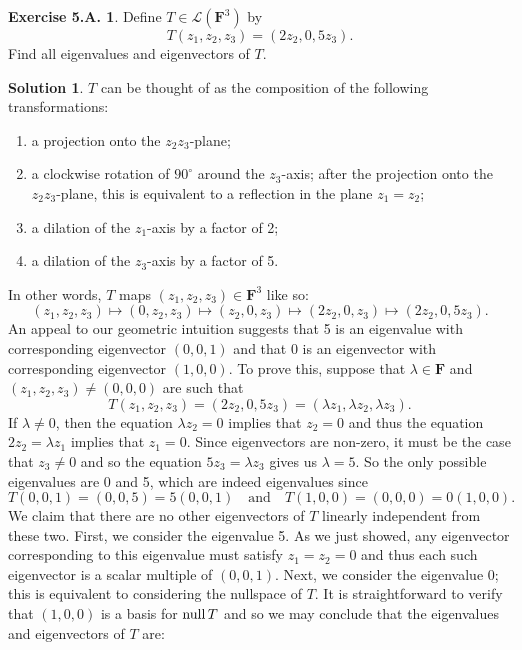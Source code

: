 \documentclass[12pt]{article}
\theoremstyle{definition}
\theoremstyle{exercise}
\newtheorem{exercise}{Exercise 5.A.}
\theoremstyle{solution}
\newtheorem*{solution}{Solution}
\newcommand{\lmap}{\mathcal{L}}
\newcommand{\Null}{\text{null\,}}
\newcommand{\quand}{\quad \text{and} \quad}
\newcommand{\F}{\mathbf{F}}
\begin{document}
\begin{exercise}
\label{ex:9}
    Define \( T \in \lmap(\F^3) \) by
    \[
        T(z_1, z_2, z_3) = (2 z_2, 0, 5 z_3).
    \]
    Find all eigenvalues and eigenvectors of \( T \).
\end{exercise}

\begin{solution}
    \( T \) can be thought of as the composition of the following transformations:
    \begin{enumerate}[label=\arabic*.]
        \item a projection onto the \( z_2 z_3 \)-plane;
        \item a clockwise rotation of \( 90^{\circ} \) around the \( z_3 \)-axis; after the projection onto the \( z_2 z_3 \)-plane, this is equivalent to a reflection in the plane \( z_1 = z_2 \);
        \item a dilation of the \( z_1 \)-axis by a factor of 2;
        \item a dilation of the \( z_3 \)-axis by a factor of 5.
    \end{enumerate}
    In other words, \( T \) maps \( (z_1, z_2, z_3) \in \F^3 \) like so:
    \[
        (z_1, z_2, z_3) \mapsto (0, z_2, z_3) \mapsto (z_2, 0, z_3) \mapsto (2 z_2, 0, z_3) \mapsto (2 z_2, 0, 5 z_3).
    \]
    An appeal to our geometric intuition suggests that 5 is an eigenvalue with corresponding eigenvector \( (0, 0, 1) \) and that 0 is an eigenvector with corresponding eigenvector \( (1, 0, 0) \). To prove this, suppose that \( \lambda \in \F \) and \( (z_1, z_2, z_3) \neq (0, 0, 0) \) are such that
    \[
        T(z_1, z_2, z_3) = (2 z_2, 0, 5 z_3) = (\lambda z_1, \lambda z_2, \lambda z_3).
    \]
    If \( \lambda \neq 0 \), then the equation \( \lambda z_2 = 0 \) implies that \( z_2 = 0 \) and thus the equation \( 2 z_2 = \lambda z_1 \) implies that \( z_1 = 0 \). Since eigenvectors are non-zero, it must be the case that \( z_3 \neq 0 \) and so the equation \( 5 z_3 = \lambda z_3 \) gives us \( \lambda = 5 \). So the only possible eigenvalues are 0 and 5, which are indeed eigenvalues since
    \[
        T(0, 0, 1) = (0, 0, 5) = 5(0, 0, 1) \quand T(1, 0, 0) = (0, 0, 0) = 0(1, 0, 0).
    \]
    We claim that there are no other eigenvectors of \( T \) linearly independent from these two. First, we consider the eigenvalue 5. As we just showed, any eigenvector corresponding to this eigenvalue must satisfy \( z_1 = z_2 = 0 \) and thus each such eigenvector is a scalar multiple of \( (0, 0, 1) \). Next, we consider the eigenvalue 0; this is equivalent to considering the nullspace of \( T \). It is straightforward to verify that \( (1, 0, 0) \) is a basis for \( \Null T \) and so we may conclude that the eigenvalues and eigenvectors of \( T \) are:

\end{solution}
\end{document}
